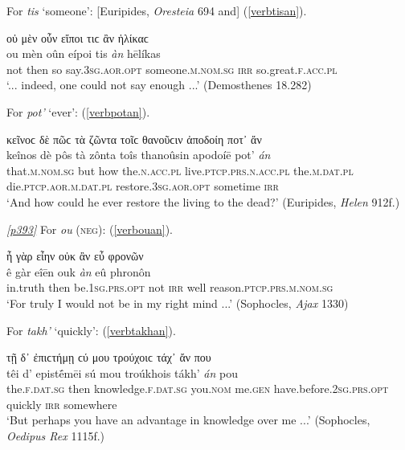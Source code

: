 For \emph{tis} `someone': {[}Euripides, \textit{Oresteia} 694 and{]} (\ref{verbtisan}).

\begin{exe}
\ex οὐ μὲν οὖν εἴποι τιϲ ἂν ἡλίκαϲ\\
\gll ou mèn oûn eípoi tis \emph{àn} hēlíkas\\
not then so say.\textsc{3sg.aor.opt} someone.\textsc{m.nom.sg} \textsc{irr} so.great.\textsc{f.acc.pl}\\
\trans `... indeed, one could not say enough ...' (Demosthenes 18.282)
\label{verbtisan}
\end{exe}

For \emph{pot'} `ever': (\ref{verbpotan}).

\begin{exe}
\ex κεῖνοϲ δὲ πῶϲ τὰ ζῶντα τοῖϲ θανοῦϲιν ἀποδοίη ποτ᾽ ἄν\\
\gll keînos dè pôs tà zônta toîs thanoûsin apodoíē pot' \emph{án}\\
that.\textsc{m.nom.sg} but how the.\textsc{n.acc.pl} live.\textsc{ptcp.prs.n.acc.pl} the.\textsc{m.dat.pl} die.\textsc{ptcp.aor.m.dat.pl} restore.\textsc{3sg.aor.opt} sometime \textsc{irr}\\
\trans `And how could he ever restore the living to the dead?' (Euripides, \textit{Helen} 912f.)
\label{verbpotan}
\end{exe}

\hyperlink{p393}{\emph{[p393]}} For \emph{ou} (\textsc{neg}): (\ref{verbouan}).

\begin{exe}
\ex ἦ γὰρ εἶην οὐκ ἂν εὖ φρονῶν\\
\gll ê gàr eîēn ouk \emph{àn} eû phronôn\\
in.truth then be.\textsc{1sg.prs.opt} not \textsc{irr} well reason.\textsc{ptcp.prs.m.nom.sg}\\
\trans `For truly I would not be in my right mind ...' (Sophocles, \textit{Ajax} 1330)
\label{verbouan}
\end{exe}

For \emph{takh'} `quickly': (\ref{verbtakhan}).

\begin{exe}
\ex τῇ δ᾽ ἐπιϲτήμῃ ϲύ μου τρούχοιϲ τάχ᾽ ἄν που\\
\gll têi d' epistḗmēi sú mou troúkhois tákh' \emph{án} pou\\
the.\textsc{f.dat.sg} then knowledge.\textsc{f.dat.sg} you.\textsc{nom} me.\textsc{gen} have.before.\textsc{2sg.prs.opt} quickly \textsc{irr} somewhere\\
\trans `But perhaps you have an advantage in knowledge over me ...' (Sophocles, \textit{Oedipus Rex} 1115f.)
\label{verbtakhan}
\end{exe}

